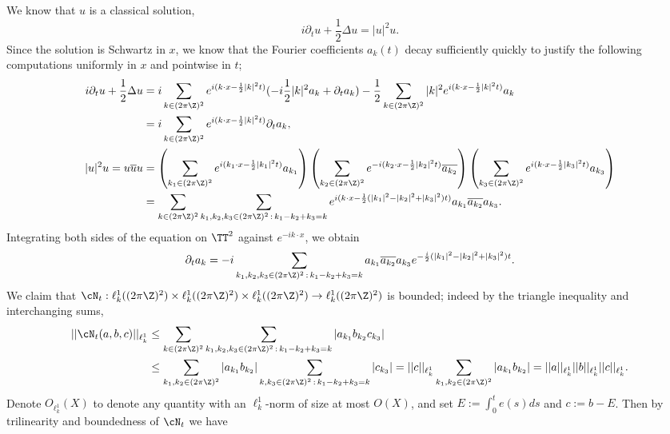 \begin{solution}
	We know that $u$ is a classical solution, 
		\[ i \partial_t u + \frac12 \Delta u = |u|^2 u. \]
	Since the solution is Schwartz in $x$, we know that the Fourier coefficients $a_k (t)$ decay sufficiently quickly to justify the following computations uniformly in $x$ and pointwise in $t$; 
		\begin{align*}
			i \partial_t u + \frac12 \Delta u
				&= i \sum_{k \in (2\pi\Z)^2} e^{i (k \cdot x - \frac12 |k|^2 t)} (- i \frac12 |k|^2 a_k + \partial_t a_k) -  \frac12 \sum_{k \in (2\pi\Z)^2} |k|^2 e^{i (k \cdot x - \frac12 |k|^2 t)}  a_k \\
				&= i\sum_{k \in (2\pi \Z)^2} e^{i(k \cdot x - \frac12 |k|^2 t)} \partial_t a_k, \\
			|u|^2 u = u \overline u u
				&= \left( \sum_{k_1 \in (2\pi\Z)^2} e^{i (k_1 \cdot x - \frac12 |k_1|^2 t)} a_{k_1} \right)	  \left( \sum_{k_2 \in (2\pi\Z)^2} e^{-i (k_2 \cdot x - \frac12 |k_2|^2 t)} \overline{ a_{k_2} }\right)	 	  \left( \sum_{k_3 \in (2\pi\Z)^2} e^{i (k \cdot x - \frac12 |k_3|^2 t)}  a_{k_3} \right) \\
				&=\sum_{k \in (2\pi\Z)^2} \sum_{k_1, k_2 ,k_3 \in (2\pi \Z)^2 \,:\, k_1 - k_2 + k_3 = k} e^{i (k \cdot x - \frac12 (|k_1|^2 - |k_2|^2 + |k_3|^2) t)} a_{k_1} \overline{a_{k_2}} a_{k_3}.
		\end{align*}
	Integrating both sides of the equation on $\TT^2$ against $e^{-i k \cdot x}$, we obtain
		\[ \partial_t a_k = -i \sum_{k_1, k_2, k_3 \in (2\pi \Z)^2 \, : \, k_1 - k_2 + k_3 = k} a_{k_1} \overline{a_{k_2}} a_{k_3} e^{-\frac{i}{2} (|k_1|^2 - |k_2|^2 + |k_3|^2)t} .\]
	We claim that $\cN_t : \ell^1_k ((2\pi\Z)^2) \times \ell^1_k ((2\pi\Z)^2) \times \ell^1_k ((2\pi\Z)^2)\to \ell^1_k ((2\pi \Z)^2)$ is bounded; indeed by the triangle inequality and interchanging sums, 
		\begin{align*}
			 ||\cN_t (a, b, c)||_{\ell^1_k} 
			 	&\leq \sum_{k \in (2\pi \Z)^2} \sum_{k_1, k_2, k_3 \in (2\pi \Z)^2 \, : \, k_1 - k_2 + k_3 = k} |a_{k_1} b_{k_2} c_{k_3} | \\
			 	&\leq  \sum_{k_1, k_2 \in (2\pi\Z)^2} |a_{k_1} b_{k_2} |\sum_{k, k_3 \in (2\pi \Z)^2 \, : \, k_1 - k_2 + k_3 = k}  | c_{k_3} | = ||c||_{\ell^1_k}\sum_{k_1, k_2 \in (2\pi\Z)^2} |a_{k_1} b_{k_2} | = ||a||_{\ell^1_k} ||b||_{\ell^1_k} ||c||_{\ell^1_k}.
		\end{align*}	
	Denote $O_{\ell^1_k} (X)$ to denote any quantity with an $\ell^1_k$-norm of size at most $O(X)$, and set $E:= \int_0^t e(s) ds$ and $c := b - E$. Then by trilinearity and boundedness of $\cN_t$ we have

\end{solution}
